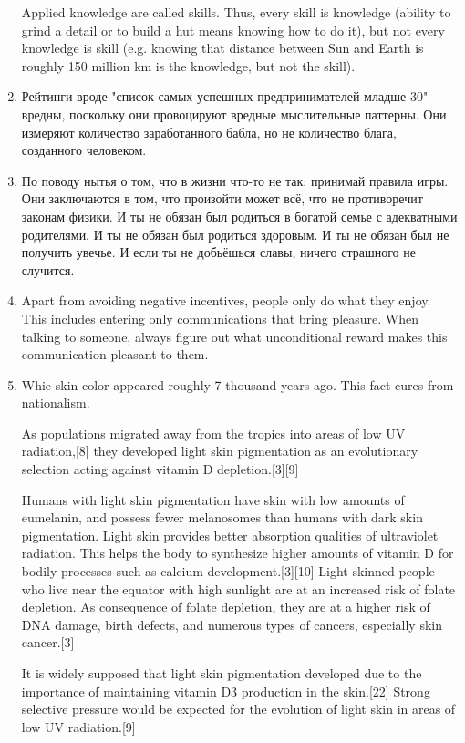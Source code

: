 \documentclass[11pt]{article}
\theoremstyle{remark}
\theoremstyle{definition}
\begin{document}
\begin{enumerate}
Applied knowledge are called skills. Thus, every skill is knowledge (ability to grind a detail or to build a hut means knowing how to do it), but not every knowledge is skill (e.g. knowing that distance between Sun and Earth is roughly 150 million km is the knowledge, but not the skill).


\item Рейтинги вроде "список самых успешных предпринимателей младше 30" вредны, поскольку они провоцируют вредные мыслительные паттерны. Они измеряют количество заработанного бабла, но не количество блага, созданного человеком.%

\item По поводу нытья о том, что в жизни что-то не так: принимай правила игры. Они заключаются в том, что произойти может всё, что не противоречит законам физики. И ты не обязан был родиться в богатой семье с адекватными родителями. И ты не обязан был родиться здоровым. И ты не обязан был не получить увечье. И если ты не добьёшься славы, ничего страшного не случится.


\item Apart from avoiding negative incentives, people only do what they enjoy. This includes entering only communications that bring pleasure. When talking to someone, always figure out what unconditional reward makes this communication pleasant to them.


\item Whie skin color appeared roughly 7 thousand years ago. This fact cures from nationalism.

As populations migrated away from the tropics into areas of low UV radiation,[8] they developed light skin pigmentation as an evolutionary selection acting against vitamin D depletion.[3][9]

Humans with light skin pigmentation have skin with low amounts of eumelanin, and possess fewer melanosomes than humans with dark skin pigmentation. Light skin provides better absorption qualities of ultraviolet radiation. This helps the body to synthesize higher amounts of vitamin D for bodily processes such as calcium development.[3][10] Light-skinned people who live near the equator with high sunlight are at an increased risk of folate depletion. As consequence of folate depletion, they are at a higher risk of DNA damage, birth defects, and numerous types of cancers, especially skin cancer.[3] 

It is widely supposed that light skin pigmentation developed due to the importance of maintaining vitamin D3 production in the skin.[22] Strong selective pressure would be expected for the evolution of light skin in areas of low UV radiation.[9]


\end{enumerate}
\end{document}
